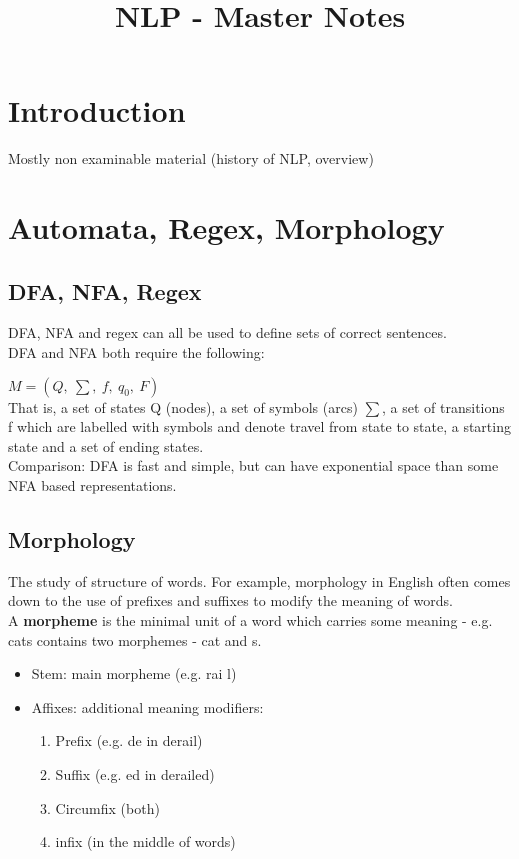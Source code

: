 \documentclass[]{article}
\title{NLP - Master Notes}
\begin{document}
	\maketitle
	
	\section{Introduction}
    
    Mostly non examinable material (history of NLP, overview)
    
	\section{Automata, Regex, Morphology}
	
	\subsection{DFA, NFA, Regex}
	DFA, NFA and regex can all be used to define sets of correct sentences. \\
	
	DFA and NFA both require the following: 
    
	$M = (Q, \: \sum, \: \mathit{f}, \: q_0, \: F)$ \\
	That is, a set of states Q (nodes), a set of symbols (arcs) $\sum$, a set of transitions f which are labelled with symbols and denote travel from state to state, a starting state and a set of ending states. \\
	
	Comparison: DFA is fast and simple, but can have exponential space than some NFA based representations.
	
    \subsection{Morphology}
	
	The study of structure of words. For example, morphology in English often comes down to the use of prefixes and suffixes to modify the meaning of words. \\
	
	A \textbf{morpheme} is the minimal unit of a word which carries some meaning - e.g. cats contains two morphemes - cat and s.
	
	\begin{itemize}
	 \item Stem: main morpheme (e.g. rai
	 l)
	 \item Affixes: additional meaning modifiers:
        \begin{enumerate}
         \item Prefix (e.g. de in derail)
         \item Suffix (e.g. ed in derailed)
         \item Circumfix (both)
         \item infix (in the middle of words)
        \end{enumerate}
	\end{itemize}
\end{document}
